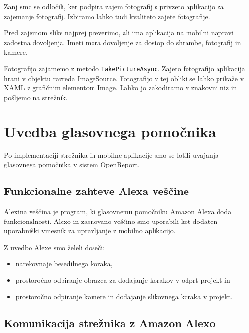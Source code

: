 \documentclass[a4paper, 12pt]{book}
\begin{document}
Zanj smo se odločili, ker podpira zajem fotografij s privzeto aplikacijo za zajemanje fotografij.
Izbiramo lahko tudi kvaliteto zajete fotografije.

Pred zajemom slike najprej preverimo, ali ima aplikacija na mobilni napravi zadostna dovoljenja.
Imeti mora dovoljenje za dostop do shrambe, fotografij in kamere.

Fotografijo zajamemo z metodo \texttt{TakePictureAsync}.
Zajeto fotografijo aplikacija hrani v objektu razreda ImageSource.
Fotografijo v tej obliki se lahko prikaže v XAML z grafičnim elementom Image.
Lahko jo zakodiramo v znakovni niz in pošljemo na strežnik.




\section{Uvedba glasovnega pomočnika}

Po implementaciji strežnika in mobilne aplikacije smo se lotili uvajanja glasovnega pomočnika v sistem OpenReport.

\subsection{Funkcionalne zahteve Alexa veščine}

Alexina veščina je program, ki glasovnemu pomočniku Amazon Alexa doda funkcionalnosti.
Alexo in zasnovano veščino smo uporabili kot dodaten uporabniški vmesnik za upravljanje z mobilno aplikacijo.

\noindent Z uvedbo Alexe smo želeli doseči:
\begin{itemize}
	\item narekovnaje besedilnega koraka,
	\item prostoročno odpiranje obrazca za dodajanje korakov v odprt projekt in
	\item prostoročno odpiranje kamere in dodajanje slikovnega koraka v projekt.
\end{itemize}


\subsection{Komunikacija strežnika z Amazon Alexo}
\end{document}
